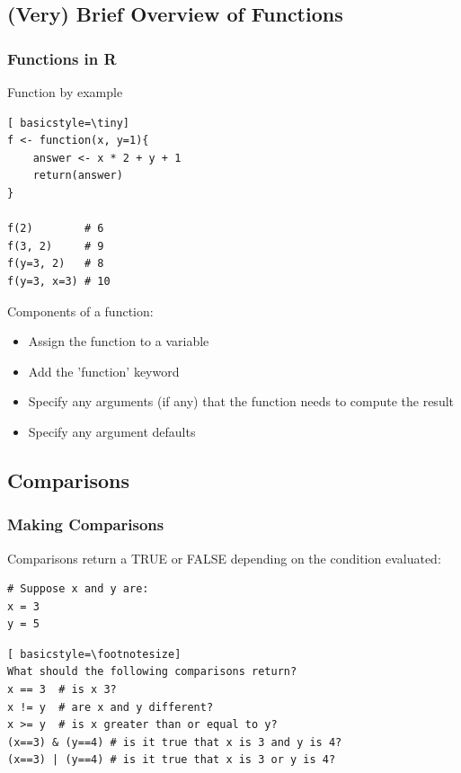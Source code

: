 \subsection{(Very) Brief Overview of Functions}
\begin{frame}[fragile]
	\frametitle{Functions in R}
	\vspace{-15pt}
	\begin{center}
		\begin{block}{Function by example}
			\begin{lstlisting}[ basicstyle=\tiny]
f <- function(x, y=1){
	answer <- x * 2 + y + 1
	return(answer)
}

f(2)        # 6
f(3, 2)     # 9
f(y=3, 2)   # 8
f(y=3, x=3) # 10
			\end{lstlisting}	
		\end{block}

		\begin{block}{Components of a function:}
			\begin{itemize}
				\item Assign the function to a variable
				\item Add the 'function' keyword
				\item Specify any arguments (if any) that the function needs to compute the result
				\item Specify any argument defaults
			\end{itemize}
		\end{block}
	\end{center} 
\end{frame}

\subsection{Comparisons}
\begin{frame}[fragile]
\frametitle{Making Comparisons}
Comparisons return a TRUE or FALSE depending on the condition evaluated:
			\begin{lstlisting}
# Suppose x and y are:
x = 3
y = 5
			\end{lstlisting}
			\begin{lstlisting}[ basicstyle=\footnotesize]
What should the following comparisons return?
x == 3  # is x 3?
x != y  # are x and y different?
x >= y  # is x greater than or equal to y?
(x==3) & (y==4) # is it true that x is 3 and y is 4?
(x==3) | (y==4) # is it true that x is 3 or y is 4?
			\end{lstlisting}	
\end{frame}


